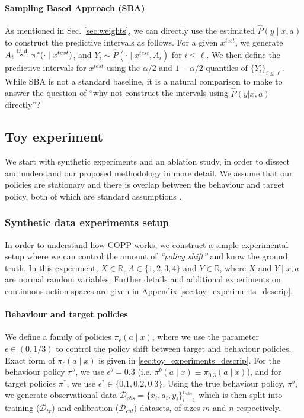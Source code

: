 \paragraph{Sampling Based Approach (SBA)} As mentioned in Sec. \ref{sec:weights}, we can directly use the estimated $\hat{P}(y\mid x, a)$ to construct the predictive intervals as follows. For a given $x^{test}$, we generate $A_i \overset{\textup{i.i.d.}}{\sim} \pi^*(\cdot \mid x^{test})$, and $Y_i \sim \hat{P}(\cdot \mid x^{test}, A_i)$ for $i \leq \ell$. We then define the predictive intervals for $x^{test}$ using the $\alpha/2$ and $1-\alpha/2$ quantiles of $\{Y_i\}_{i \leq \ell}$. While SBA is not a standard baseline, it is a natural comparison to make to answer the question of ``why not construct the intervals using $\hat{P}(y|x, a)$ directly''?


\subsection{Toy experiment}\label{sec:exp_toy} 
 We start with synthetic experiments and an ablation study, in order to dissect and understand our proposed methodology in more detail. We assume that our policies are stationary and there is overlap between the behaviour and target policy, both of which are standard assumptions \citep{risk-assessment, drobust, ope-rl}.
\subsubsection{Synthetic data experiments setup}

In order to understand how COPP works, we construct a simple experimental setup where we can control the amount of \textit{``policy shift''} and know the ground truth. In this experiment, $X \in \mathbb{R}$, $A \in \{1, 2, 3, 4\}$ and $Y \in \mathbb{R}$, where $X$ and $Y\mid x, a$ are normal random variables. Further details and additional experiments on continuous action spaces are given in Appendix \ref{sec:toy_experiments_descrip}.   

\paragraph{Behaviour and target policies}
We define a family of policies $\pi_\epsilon(a \mid x)$, where we use the parameter $\epsilon \in (0,1/3)$ to control the policy shift between target and behaviour policies. Exact form of $\pi_\epsilon(a \mid x)$ is given in \ref{sec:toy_experiments_descrip}. For the behaviour policy $\pi^b$, we use $\epsilon^b = 0.3$ (i.e. $\pi^b(a \mid x) \equiv  \pi_{0.3}(a \mid x)$), and for target policies $\pi^*$, we use $\epsilon^* \in \{0.1, 0.2, 0.3\}$. Using the true behaviour policy, $\pi^b$, we generate observational data $\mathcal{D}_{obs} = \{x_i, a_i, y_i\}_{i=1}^{n_{obs}}$ which is then split into training ($\mathcal{D}_{tr}$) and calibration ($\mathcal{D}_{cal}$) datasets, of sizes $m$ and $n$ respectively.

